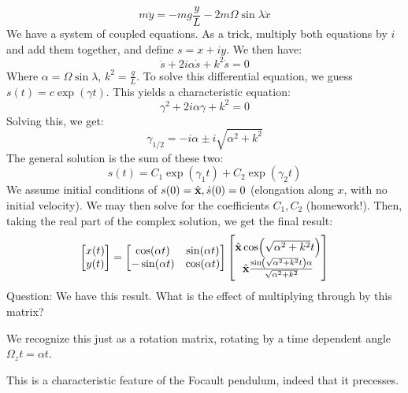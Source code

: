 \[m\ddot{y} = -mg\frac{y}{L} - 2m\Omega\sin\lambda\dot{x}\]
We have a system of coupled equations. As a trick, multiply both equations by $i$ and add them together, and define $s = x + iy$. We then have:
\[\ddot{s} + 2i\alpha \dot{s} + k^2\dot{s} = 0\]
Where $\alpha = \Omega\sin\lambda$, $k^2 = \frac{g}{L}$. To solve this differential equation, we guess $s(t) = c\exp(\gamma t)$. This yields a characteristic equation:
\[\gamma^2 + 2i\alpha\gamma + k^2 = 0\]
Solving this, we get:
\[\gamma_{1/2} = -i\alpha \pm i\sqrt{\alpha^2 + k^2}\]
The general solution is the sum of these two:
\[s(t) = C_1\exp(\gamma_1 t) + C_2\exp(\gamma_2 t)\]
We assume initial conditions of $s(0) = \hat{\mathbf{x}}, \dot{s}(0) = 0$ (elongation along $x$, with no initial velocity). We may then solve for the coefficients $C_1, C_2$ (homework!). Then, taking the real part of the complex solution, we get the final result:
\[\begin{bmatrix}x(t) \\ y(t)\end{bmatrix} = \begin{bmatrix}\cos(\alpha t) & \sin(\alpha t) \\ -\sin(\alpha t) & \cos(\alpha t)\end{bmatrix}\begin{bmatrix}\hat{\mathbf{x}} \cos(\sqrt{\alpha^2 + k^2} t) \\ \hat{\mathbf{x}}\frac{\sin(\sqrt{\alpha^2 + k^2}t)\alpha }{\sqrt{\alpha^2 + k^2}}\end{bmatrix}\]
Question: We have this result. What is the effect of multiplying through by this matrix? 
\begin{s}
We recognize this just as a rotation matrix, rotating by a time dependent angle $\Omega_zt = \alpha t$.
\end{s}
This is a characteristic feature of the Focault pendulum, indeed that it precesses. 